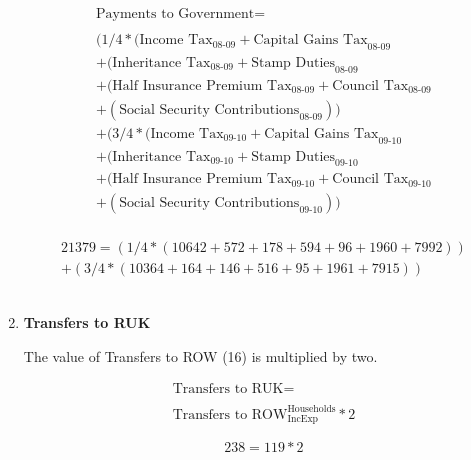 \begin{enumerate}
\begin{equation}
\begin{split}
\text{Payments to Government} =  \\ \\
(1/4*(\text{Income Tax}_\text{08-09}+\text{Capital Gains Tax}_\text{08-09}\\
+(\text{Inheritance Tax}_\text{08-09}+\text{Stamp Duties}_\text{08-09}\\
+(\text{Half Insurance Premium Tax}_\text{08-09}+\text{Council Tax}_\text{08-09}\\
+(\text{Social Security Contributions}_\text{08-09}))\\
+(3/4*(\text{Income Tax}_\text{09-10}+\text{Capital Gains Tax}_\text{09-10}\\
+(\text{Inheritance Tax}_\text{09-10}+\text{Stamp Duties}_\text{09-10}\\
+(\text{Half Insurance Premium Tax}_\text{09-10}+\text{Council Tax}_\text{09-10}\\
+(\text{Social Security Contributions}_\text{09-10}))\\
\end{split} \label{eq:2.5.17}
\end{equation}

\begin{equation} \nonumber
\begin{split}
21379=(1/4*(10642+572+178+594+96+1960+7992))\\
+(3/4*(10364+164+146+516+95+1961+7915))
\end{split}
\end{equation}\\


\item \textbf {Transfers to RUK}

The value of Transfers to ROW (16) is multiplied by two.

\begin{equation}
\begin{split}
\text{Transfers to RUK} =  \\ \\
\text{Transfers to ROW}^\text{Households}_\text{IncExp}*2
\end{split} \label{eq:2.5.18}
\end{equation}

\begin{equation} \nonumber
238 = 119*2
\end{equation}\\



\end{enumerate}
